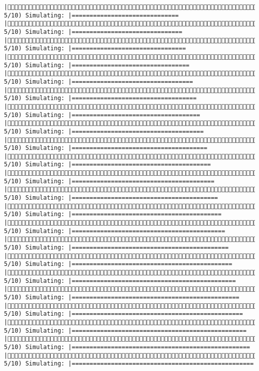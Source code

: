 \documentclass[]{article}
\begin{document}
\begin{verbatim}
|( 5/10) Simulating: |==============================                       |( 5/10) Simulating: |===============================                      |( 5/10) Simulating: |================================                     |( 5/10) Simulating: |=================================                    |( 5/10) Simulating: |==================================                   |( 5/10) Simulating: |===================================                  |( 5/10) Simulating: |====================================                 |( 5/10) Simulating: |=====================================                |( 5/10) Simulating: |======================================               |( 5/10) Simulating: |=======================================              |( 5/10) Simulating: |========================================             |( 5/10) Simulating: |=========================================            |( 5/10) Simulating: |==========================================           |( 5/10) Simulating: |===========================================          |( 5/10) Simulating: |============================================         |( 5/10) Simulating: |=============================================        |( 5/10) Simulating: |==============================================       |( 5/10) Simulating: |===============================================      |( 5/10) Simulating: |================================================     |( 5/10) Simulating: |=================================================    |( 5/10) Simulating: |==================================================   |( 5/10) Simulating: |===================================================  
\end{verbatim}
\end{document}
